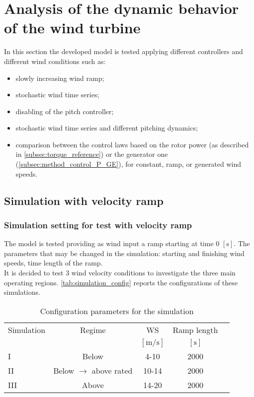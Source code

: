 \newpage
\section{Analysis of the dynamic behavior of the wind turbine}\label{sec:c_basic_model_simulation}
In this section the developed model is tested applying different controllers and different wind conditions such as:
\begin{itemize}
  \item slowly increasing wind ramp;
  \item stochastic wind time series;
  \item disabling of the pitch controller;
  \item stochastic wind time series and different pitching dynamics;
  \item comparison between the control laws based on the rotor power (as described in \autoref{subsec:torque_reference}) or the generator one (\autoref{subsec:method_control_P_GE}), for constant, ramp, or generated wind speeds.
\end{itemize}
\subsection{Simulation with velocity ramp}
\subsubsection[Simulation setting]{Simulation setting for test with velocity ramp}
The model is tested providing as wind input a ramp starting at time 0 $\left[\si{\second}\right]$. The parameters that may be changed in the simulation: starting and finishing wind speeds, time length of the ramp.\\
It is decided to test 3 wind velocity conditions to investigate the three main operating regions. \autoref{tab:simulation_config} reports the configurations of these simulations. 
\begin{table}[htb]
    \caption{Configuration parameters for the simulation}
    \centering
    \begin{tabular}{lcccc}
    \toprule
      Simulation & Regime  & WS & Ramp length \\ 
       & & $\left[\si{\meter\per\second}\right]$ & $\left[\si{\second}\right]$ \\ \midrule       
       I & Below & 4-10 & 2000  \\
       II & Below $\rightarrow$ above rated & 10-14 & 2000 \\
       III & Above & 14-20 & 2000  \\
       \bottomrule
    \end{tabular}
    \label{tab:simulation_config}
\end{table}

